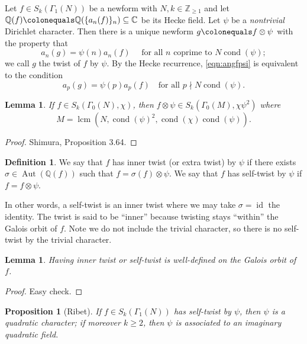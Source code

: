 \documentclass[11pt]{amsart}
\numberwithin{equation}{subsection}
\theoremstyle{plain}
\newtheorem{prop}[equation]{Proposition}
\newtheorem{lem}[equation]{Lemma}
\theoremstyle{definition}
\newtheorem{defn}[equation]{Definition}
\newcommand{\Q}{\mathbb{Q}}
\newcommand{\Z}{\mathbb{Z}}
\newcommand{\C}{\mathbb{C}}
\newcommand{\defi}[1]{\textsf{#1}} 	%
\DeclareMathOperator{\Aut}{Aut}
\DeclareMathOperator{\cond}{cond}
\DeclareMathOperator{\lcm}{lcm}
\DeclareMathOperator{\id}{id}
\begin{document}
Let $f \in S_k(\Gamma_1(N))$ be a newform with $N,k \in \Z_{\geq 1}$ and let $\Q(f) \colonequals \Q(\{a_n(f)\}_n) \subseteq \C$ be its Hecke field.  Let $\psi$ be a \emph{nontrivial} Dirichlet character.  Then there is a unique newform $g \colonequals f \otimes \psi$ with the property that 
\begin{equation} \label{eqn:angfpsi}
a_n(g)=\psi(n)a_n(f) \quad \text{ for all $n$ coprime to $N\cond(\psi)$};
\end{equation}
we call $g$ the \defi{twist} of $f$ by $\psi$.  By the Hecke recurrence, \eqref{eqn:angfpsi} is equivalent to the condition 
\begin{equation}
a_p(g)=\psi(p)a_p(f) \quad \text{for all $p \nmid N\cond(\psi)$.}
\end{equation}

\begin{lem} \label{lem:MNchipsi}
If $f \in S_k(\Gamma_0(N),\chi)$, then $f \otimes \psi \in S_k(\Gamma_0(M),\chi\psi^2)$ where
\begin{equation} \label{eqn:MNpsi}
M = \lcm(N,\cond(\psi)^2,\cond(\chi)\cond(\psi)). 
\end{equation}
\end{lem}

\begin{proof}
Shimura, Proposition 3.64.
\end{proof}

\begin{defn}
We say that $f$ has \defi{inner twist} (or \defi{extra twist}) by $\psi$ if there exists $\sigma \in \Aut(\Q(f))$ such that $f=\sigma(f) \otimes \psi$.  We say that $f$ has \defi{self-twist} by $\psi$ if $f=f \otimes \psi$.
\end{defn}

In other words, a self-twist is an inner twist where we may take $\sigma=\id$ the identity.  The twist is said to be ``inner'' because twisting stays ``within'' the Galois orbit of $f$.  Note we do not include the trivial character, so there is no self-twist by the trivial character.  

\begin{lem}
Having inner twist or self-twist is well-defined on the Galois orbit of $f$.
\end{lem}

\begin{proof}
Easy check.
\end{proof}

\begin{prop}[Ribet] \label{prop:ribetcm}
If $f \in S_k(\Gamma_1(N))$ has self-twist by $\psi$, then $\psi$ is a quadratic character; if moreover $k \geq 2$, then $\psi$ is associated to an imaginary quadratic field.
\end{prop}
\end{document}
